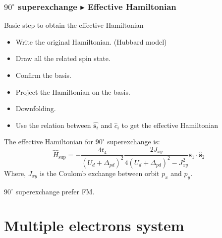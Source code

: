 \documentclass{beamer}
\begin{document}
  \begin{frame}
    \frametitle{\(90^{\circ}\) superexchange \(\blacktriangleright\) Effective Hamiltonian}
    \begin{block}{Basic step to obtain the effective Hamiltonian}
      \begin{itemize}
        \item Write the original Hamiltonian. (Hubbard model)
        \item Draw all the related spin state.
        \item Confirm the basis.
        \item Project the Hamiltonian on the basis.
        \item Downfolding.
        \item Use the relation between \(\widehat{\bm{s}_i}\) and \(\widehat{c}_i\) to get the effective Hamiltonian
      \end{itemize}
    \end{block}
    The effective Hamiltonian for \(90^{\circ}\) superexchange is:
    \begin{equation}
      \widehat{H}_{\text{sup}} = -\dfrac{4t_4}{(U_d+\Delta_{pd})^2} \dfrac{2J_{xy}}{4(U_d+\Delta_{pd})^2-J^2_{xy}}\widehat{\bm{s}}_1 \cdot \widehat{\bm{s}}_2
    \end{equation}
    Where, \(J_{xy}\) is the Coulomb exchange between orbit \(p_x\) and \(p_y\).

    \(90^{\circ}\) superexchange prefer FM.
  \end{frame}

  \section{Multiple electrons system}
\end{document}
